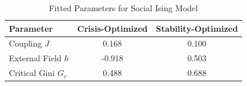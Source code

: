 
\begin{table}[htbp]
\centering
\caption{Fitted Parameters for Social Ising Model}
\label{tab:ising_parameters}
\begin{tabular}{lcc}
\toprule
\textbf{Parameter} & \textbf{Crisis-Optimized} & \textbf{Stability-Optimized} \\
\midrule
Coupling $J$ & 0.168 & 0.100 \\
External Field $h$ & -0.918 & 0.503 \\
Critical Gini $G_c$ & 0.488 & 0.688 \\
\bottomrule
\end{tabular}
\end{table}
